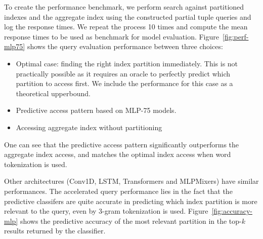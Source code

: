 \documentclass[conference]{IEEEtran}
\begin{document}
To create the performance benchmark, we perform search against partitioned indexes and the aggregate index using the constructed partial tuple queries and log the response times. We repeat the process 10 times and compute the mean response times to be used as benchmark for model evaluation. Figure~\ref{fig:perf-mlp75} shows the query evaluation performance between three choices:
\begin{itemize}
\item Optimal case: finding the right index partition immediately.  This is not practically possible as it requires an oracle to perfectly predict which partition to access first.  We include the performance for this case as a theoretical upperbound.
\item Predictive access pattern based on MLP-75 models.
\item Accessing aggregate index without partitioning
\end{itemize}
One can see that the predictive access pattern significantly outperforms
the aggregate index access, and matches the optimal index access when word tokenization is used.

Other architectures (Conv1D, LSTM, Transformers and MLPMixers) have similar performances.  The accelerated query performance lies in the fact that the predictive classifers are quite accurate in predicting which index partition
is more relevant to the query, even by 3-gram tokenization is used.  Figure~\ref{fig:accuracy-mlp} shows the predictive accuracy of the most relevant partition in the top-$k$ results returned by the classifier.
\end{document}
